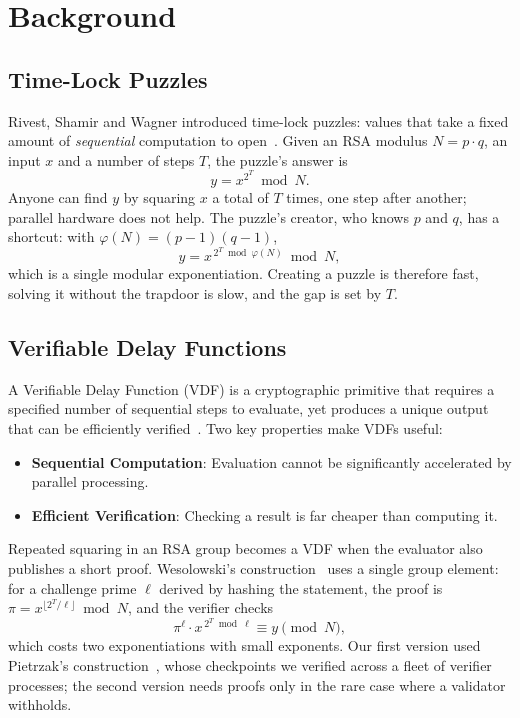\section{Background}\label{sec:background}

\subsection{Time-Lock Puzzles}\label{sec:timelock}
Rivest, Shamir and Wagner introduced time-lock puzzles: values that take a fixed amount of \emph{sequential} computation to open~\cite{rivest1996timelock}. Given an RSA modulus $N = p \cdot q$, an input $x$ and a number of steps $T$, the puzzle's answer is
\begin{equation}
    y = x^{2^T} \bmod N .
\end{equation}
Anyone can find $y$ by squaring $x$ a total of $T$ times, one step after another; parallel hardware does not help. The puzzle's creator, who knows $p$ and $q$, has a shortcut: with $\varphi(N) = (p-1)(q-1)$,
\begin{equation}
    y = x^{\,2^T \bmod \varphi(N)} \bmod N ,
\end{equation}
which is a single modular exponentiation. Creating a puzzle is therefore fast, solving it without the trapdoor is slow, and the gap is set by $T$.

\subsection{Verifiable Delay Functions}\label{sec:vdf}
A Verifiable Delay Function (VDF) is a cryptographic primitive that requires a specified number of sequential steps to evaluate, yet produces a unique output that can be efficiently verified~\cite{boneh2018verifiable}. Two key properties make VDFs useful:
\begin{itemize}
    \item \textbf{Sequential Computation}: Evaluation cannot be significantly accelerated by parallel processing.
    \item \textbf{Efficient Verification}: Checking a result is far cheaper than computing it.
\end{itemize}
Repeated squaring in an RSA group becomes a VDF when the evaluator also publishes a short proof. Wesolowski's construction~\cite{wesolowski2019efficient} uses a single group element: for a challenge prime $\ell$ derived by hashing the statement, the proof is $\pi = x^{\lfloor 2^T/\ell \rfloor} \bmod N$, and the verifier checks
\begin{equation}
    \pi^{\ell} \cdot x^{\,2^T \bmod \ell} \equiv y \pmod N ,
\end{equation}
which costs two exponentiations with small exponents. Our first version used Pietrzak's construction~\cite{pietrzak2019simple}, whose checkpoints we verified across a fleet of verifier processes; the second version needs proofs only in the rare case where a validator withholds.

